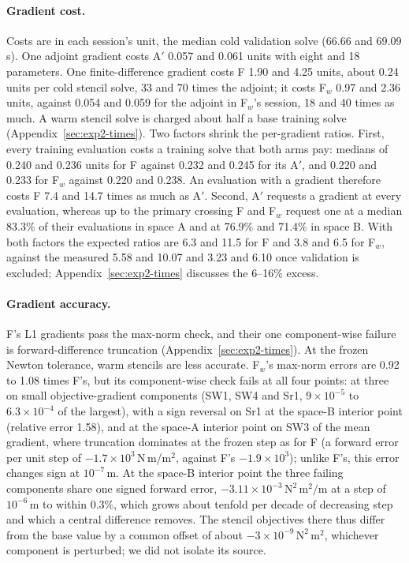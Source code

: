\paragraph{Gradient cost.}
Costs are in each session's unit, the median cold validation solve (66.66
and 69.09\,s). One adjoint gradient costs A$'$ 0.057 and 0.061 units with
eight and 18 parameters. One finite-difference gradient costs F 1.90 and
4.25 units, about 0.24 units per cold stencil solve, 33 and 70 times the
adjoint; it costs F$_w$ 0.97 and 2.36 units, against 0.054 and 0.059 for
the adjoint in F$_w$'s session, 18 and 40 times as much. A warm
stencil solve is charged about half a base training solve
(Appendix~\ref{sec:exp2-times}). Two factors shrink the per-gradient ratios. First, every training
evaluation costs a training solve that both arms pay: medians of 0.240 and
0.236 units for F against 0.232 and 0.245 for its A$'$, and 0.220 and
0.233 for F$_w$ against 0.220 and 0.238. An evaluation with a gradient
therefore costs F 7.4 and 14.7 times as much as A$'$. Second, A$'$
requests a gradient at every evaluation, whereas up to the primary
crossing F and F$_w$ request one at a median 83.3\% of their evaluations
in space A and at 76.9\% and 71.4\% in space B. With both factors the expected
ratios are 6.3 and 11.5 for F and 3.8 and 6.5 for F$_w$, against the
measured 5.58 and 10.07 and 3.23 and 6.10 once validation is excluded;
Appendix~\ref{sec:exp2-times} discusses the 6--16\% excess.

\paragraph{Gradient accuracy.}
F's L1 gradients pass the max-norm check, and their one component-wise
failure is forward-difference truncation (Appendix~\ref{sec:exp2-times}).
At the frozen Newton tolerance, warm stencils
are less accurate. F$_w$'s max-norm errors are 0.92 to 1.08 times F's, but
its component-wise check fails at all four points: at three on small
objective-gradient components (SW1, SW4 and Sr1, $9\times10^{-5}$ to
$6.3\times10^{-4}$ of the largest), with a sign reversal on Sr1 at the
space-B interior point (relative error 1.58), and at the space-A interior
point on SW3 of the mean gradient, where truncation dominates at the frozen
step as for F (a forward error per unit step of
$-1.7\times10^{3}$\,N\,m/m$^2$, against F's $-1.9\times10^{3}$); unlike
F's, this error changes sign at $10^{-7}$\,m. At the
space-B interior point the three failing components share one signed
forward error, $-3.11\times10^{-3}\,\mathrm{N^2\,m^2/m}$ at a step of
$10^{-6}$\,m to within 0.3\%, which grows about tenfold per decade of decreasing step and which a
central difference removes. The stencil objectives there thus differ from
the base value by a common offset of about
$-3\times10^{-9}\,\mathrm{N^2\,m^2}$, whichever component is perturbed; we
did not isolate its source.

